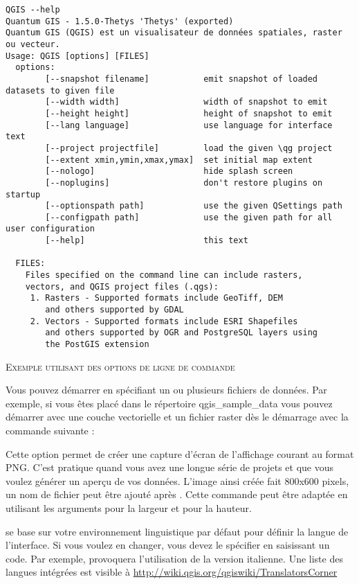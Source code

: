 \small
\begin{verbatim}
QGIS --help
Quantum GIS - 1.5.0-Thetys 'Thetys' (exported)
Quantum GIS (QGIS) est un visualisateur de données spatiales, raster ou vecteur.
Usage: QGIS [options] [FILES]
  options:
		[--snapshot filename]           emit snapshot of loaded datasets to given file
		[--width width]                 width of snapshot to emit
		[--height height]               height of snapshot to emit
		[--lang language]               use language for interface text
		[--project projectfile]         load the given \qg project
		[--extent xmin,ymin,xmax,ymax]  set initial map extent
		[--nologo]                      hide splash screen
		[--noplugins]                   don't restore plugins on startup
		[--optionspath path]            use the given QSettings path
		[--configpath path]             use the given path for all user configuration
		[--help]                        this text

  FILES:
    Files specified on the command line can include rasters,
    vectors, and QGIS project files (.qgs):
     1. Rasters - Supported formats include GeoTiff, DEM
        and others supported by GDAL
     2. Vectors - Supported formats include ESRI Shapefiles
        and others supported by OGR and PostgreSQL layers using
        the PostGIS extension
\end{verbatim}
\normalsize

\begin{Tip} \caption{\textsc{Exemple utilisant des options de ligne de commande}}
Vous pouvez démarrer \qg en spécifiant un ou plusieurs fichiers de données. Par exemple, si vous êtes placé dans le répertoire qgis\_sample\_data vous pouvez démarrer \qg avec une couche vectorielle et un fichier raster dès le démarrage avec la commande suivante : 
\end{Tip}

Cette option permet de créer une capture d'écran de l'affichage courant au format PNG. C'est pratique quand vous avez une longue série de projets et que vous voulez générer un aperçu de vos données. L'image ainsi créée fait 800x600 pixels, un nom de fichier peut être ajouté après . Cette commande peut être adaptée en utilisant les arguments  pour la largeur et  pour la hauteur.

\qg se base sur votre environnement linguistique par défaut pour définir la langue de l'interface. Si vous voulez en changer, vous devez le spécifier en saisissant un code. 
Par exemple,  provoquera l'utilisation de la version italienne. Une liste des langues intégrées est visible à \url{http://wiki.qgis.org/qgiswiki/TranslatorsCorner}

